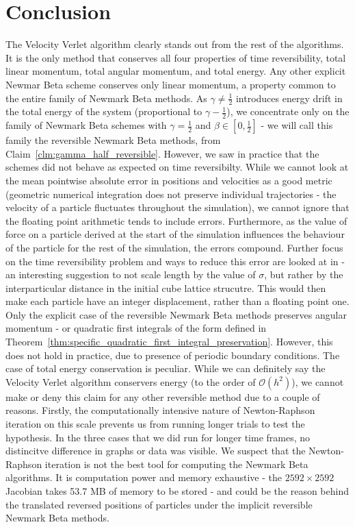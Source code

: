 \documentclass[../Main.tex]{subfiles}
\begin{document}
\section{Conclusion}

The Velocity Verlet algorithm clearly stands out from the rest of the algorithms. It is the only method that conserves all four properties of time reversibility, total linear momentum, total angular momentum, and total energy. Any other explicit Newmar Beta scheme conserves only linear momentum, a property common to the entire family of  Newmark Beta methods. As $\gamma \neq \frac{1}{2}$ introduces energy drift in the total energy of the system (proportional to $\gamma  - \frac{1}{2}$), we concentrate only on the family of Newmark Beta schemes with $\gamma = \frac{1}{2}$ and $\beta \in \left[0, \frac{1}{2}\right]$ - we will call this family the reversible Newmark Beta  methods, from Claim~\ref{clm:gamma_half_reversible}. However, we saw in practice that the schemes did not behave as expected on time reversibilty. While we cannot look at the mean pointwise absolute error in positions and velocities as a good metric (geometric numerical integration does not preserve individual trajectories - the velocity of a particle fluctuates throughout the simulation), we cannot ignore that the floating point arithmetic tends to include errors. Furthermore, as the value of force on a particle derived at the start of the simulation influences the behaviour of the particle for the rest of the simulation, the errors compound. Further focus on the time reversibility problem and ways to reduce this error are looked at in \cite{Levesque1993} - an interesting suggestion to not scale length by the value of $\sigma$, but rather by the interparticular distance in the initial cube lattice strucutre. This would then make each particle have an integer displacement, rather than a floating point one.
Only the explicit case of the reversible Newmark Beta methods preserves angular momentum - or quadratic first integrals of the form defined in Theorem~\ref{thm:specific_quadratic_first_integral_preservation}. However, this does not hold in practice, due to presence of periodic boundary conditions.
The case of total energy conservation is peculiar. While we can definitely say the Velocity Verlet algorithm conservers energy (to the order of $\mathcal{O}\left(h^{2}\right)$), we cannot make or deny this claim for any other reversible method due to a couple of reasons. Firstly, the computationally intensive nature of Newton-Raphson iteration on this scale prevents us from running longer trials to test the hypothesis. In the three cases that we did run for longer time frames, no distincitve difference in graphs or data was visible. We suspect that the Newton-Raphson iteration is not the best tool for computing the Newmark Beta algorithms. It is computation power and memory exhaustive - the $2592\times 2592$ Jacobian takes 53.7 MB of memory to be stored - and could be the reason behind the translated reversed positions of particles under the implicit reversible Newmark Beta methods.
\end{document}
